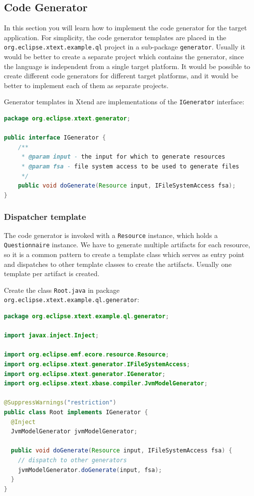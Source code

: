 \subsection{Code Generator}

In this section you will learn how to implement the code generator for 
the target application. For simplicity, the code generator templates are placed
in the \texttt{org.eclipse.xtext.example.ql} project in a sub-package \texttt{generator}. 
Usually it would be better to create a separate project which contains the generator,
since the language is independent from a single target platform. It would
be possible to create different code generators for different target platforms,
and it would be better to implement each of them as separate projects.

Generator templates in Xtend are implementations of the \texttt{IGenerator}
interface:

\begin{lstlisting}[language=Java]
package org.eclipse.xtext.generator;

public interface IGenerator {
	/**
	 * @param input - the input for which to generate resources
	 * @param fsa - file system access to be used to generate files
	 */
	public void doGenerate(Resource input, IFileSystemAccess fsa);
}
\end{lstlisting}

\subsubsection {Dispatcher template}

The code generator is invoked with a \texttt{Resource} instance, which holds a \texttt{Questionnaire}
instance. We have to generate multiple artifacts for each resource, so it is a common 
pattern to create a template class which serves as entry point and dispatches to other
template classes to create the artifacts. Usually one template per artifact is
created.

Create the class \texttt{Root.java} in 
package \texttt{org.eclipse.xtext.example.ql.generator}:

\begin{lstlisting}[language=Java]
package org.eclipse.xtext.example.ql.generator;

import javax.inject.Inject;

import org.eclipse.emf.ecore.resource.Resource;
import org.eclipse.xtext.generator.IFileSystemAccess;
import org.eclipse.xtext.generator.IGenerator;
import org.eclipse.xtext.xbase.compiler.JvmModelGenerator;

@SuppressWarnings("restriction")
public class Root implements IGenerator {
  @Inject
  JvmModelGenerator jvmModelGenerator;

  public void doGenerate(Resource input, IFileSystemAccess fsa) {
    // dispatch to other generators
    jvmModelGenerator.doGenerate(input, fsa);
  }
}
\end{lstlisting}

